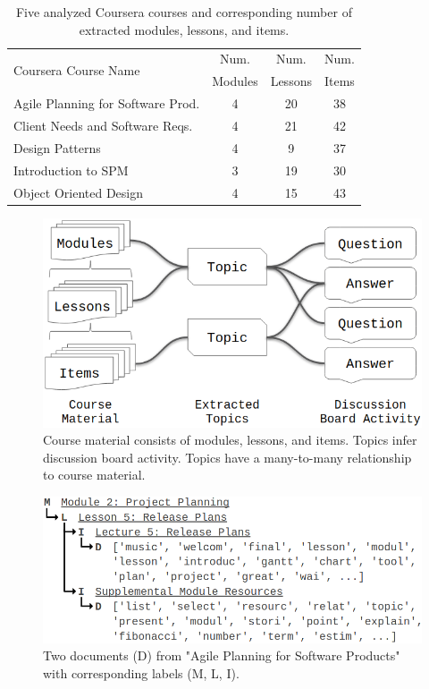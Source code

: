 \documentclass[sigconf, anonymous]{acmart}
\begin{document}
\begin{table}
\begin{tabularx}{\columnwidth}{@{}p{}ccc@{}}
    \toprule
    \multirow{2}{*}{Coursera Course Name} & Num. & Num. & Num. \\
    & Modules & Lessons & Items \\
    \midrule
    Agile Planning for Software Prod. & 4 & 20 & 38 \\
    Client Needs and Software Reqs. & 4 & 21 & 42 \\
    Design Patterns & 4 & 9 & 37 \\
    Introduction to SPM & 3 & 19 & 30 \\
    Object Oriented Design & 4 & 15 & 43 \\
    \bottomrule
\end{tabularx}
\caption{Five analyzed Coursera courses and corresponding number of extracted modules, lessons, and items.}
\label{tab:uofa-courses}
\end{table}

\begin{figure}
    \centering
    \includegraphics[width=\columnwidth]{fig/data_model.png}
    \caption{Course material consists of modules, lessons, and items. Topics infer discussion board activity. Topics have a many-to-many relationship to course material.}
    \label{fig:data_model}
\end{figure}

\begin{figure}
    \centering
    \includegraphics[width=\columnwidth]{fig/sample_doc.png}
    \caption{Two documents (D) from "Agile Planning for Software Products" with corresponding labels (M, L, I).}
    \label{fig:sample_doc}
\end{figure}
\end{document}
